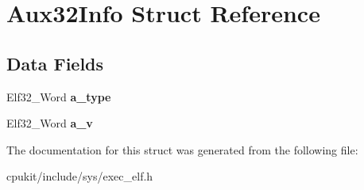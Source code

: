 \hypertarget{structAux32Info}{}\section{Aux32\+Info Struct Reference}
\label{structAux32Info}
\subsection*{Data Fields}
\begin{DoxyCompactItemize}
\item 
\mbox{\label{structAux32Info_a5ce0b9d2e6b588eaf887614410122723}} 
Elf32\+\_\+\+Word {\bfseries a\+\_\+type}
\item 
\mbox{\label{structAux32Info_a808e9f2383bda1e50c94a21b7e9a1076}} 
Elf32\+\_\+\+Word {\bfseries a\+\_\+v}
\end{DoxyCompactItemize}


The documentation for this struct was generated from the following file\+:\begin{DoxyCompactItemize}
\item 
cpukit/include/sys/exec\+\_\+elf.\+h\end{DoxyCompactItemize}
